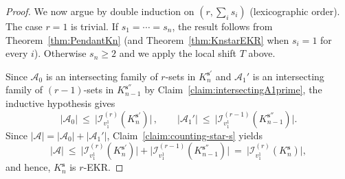 \documentclass[10pt,a4paper]{amsart}
\newcommand{\A}{\mathcal{A}}
\newcommand{\s}{\mathbf{s}}
\begin{document}
\begin{proof}
\bigskip

We now argue by double induction on $(r,\sum_i s_i)$ (lexicographic order). The case $r=1$ is trivial. If $s_1=\cdots=s_n$, the result follows from Theorem~\ref{thm:PendantKn} (and Theorem~\ref{thm:KnstarEKR} when $s_i=1$ for every $i$). Otherwise $s_n\ge 2$ and we apply the local shift $T$ above.

Since $\A_0$ is an intersecting family of $r$-sets in $K_n^{\s'}$ and $\A_1'$ is an intersecting family of $(r-1)$-sets in $K_{n-1}^{\s''}$ by Claim~\ref{claim:intersectingA1prime}, the inductive hypothesis gives
\[
|\A_0|\ \le\ \bigl|\mathcal{I}^{(r)}_{v_1^1}(K_n^{\s'})\bigr|\,,\qquad
|\A_1'|\ \le\ \bigl|\mathcal{I}^{(r-1)}_{v_1^1}(K_{n-1}^{\s''})\bigr|.
\]
Since $|\A|=|\A_0|+|\A_1'|$, Claim~\ref{claim:counting-star-s} yields
\[
|\A|\ \le\ \bigl|\mathcal{I}^{(r)}_{v_1^1}(K_n^{\s'})\bigr|+\bigl|\mathcal{I}^{(r-1)}_{v_1^1}(K_{n-1}^{\s''})\bigr|
\ =\ \bigl|\mathcal{I}^{(r)}_{v_1^1}(K_n^{\s})\bigr|,
\]
and hence, $K_n^{\s}$ is $r$-EKR.
\end{proof}
\end{document}
